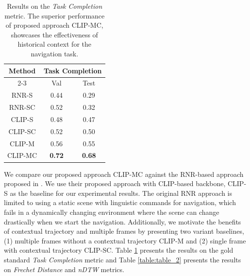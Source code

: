 \documentclass[11pt]{article}
\begin{document}
\begin{table}[]
\begin{center}
\small
\begin{tabular}{|c|cc|}
\hline
\multirow{2}{*}{Method} & \multicolumn{2}{c|}{Task Completion}               \\ \cline{2-3} 
                        & \multicolumn{1}{c|}{Val}           & Test          \\ \hline
RNR-S                   & \multicolumn{1}{c|}{0.44}          & 0.29          \\ \hline
RNR-SC                  & \multicolumn{1}{c|}{0.52}          & 0.32          \\ \hline
CLIP-S                  & \multicolumn{1}{c|}{0.48}          & 0.47          \\ \hline
CLIP-SC                 & \multicolumn{1}{c|}{0.52}          & 0.50          \\ \hline
CLIP-M                  & \multicolumn{1}{c|}{0.56}          & 0.55          \\ \hline
CLIP-MC                 & \multicolumn{1}{c|}{\textbf{0.72}} & \textbf{0.68} \\ \hline
\end{tabular}
\end{center}
\caption{Results on the \textit{Task Completion} metric. The superior performance of proposed approach CLIP-MC, showcases the effectiveness of historical context for the navigation task.}
\label{table:table_1}
\end{table}

We compare our proposed approach CLIP-MC against the RNR-based approach proposed in \cite{Rufus_2021}. We use their proposed approach with CLIP-based backbone, CLIP-S as the baseline for our experimental results. The original RNR approach is limited to using a static scene with linguistic commands for navigation, which fails in a dynamically changing environment where the scene can change drastically when we start the navigation. Additionally, we motivate the benefits of contextual trajectory and multiple frames by presenting two variant baselines, (1) multiple frames without a contextual trajectory CLIP-M and (2) single frame with contextual trajectory CLIP-SC. Table \ref{table:table_1} presents the results on the gold standard \textit{Task Completion} metric and Table \ref{table:table_2} presents the results on \textit{Frechet Distance} and \textit{nDTW} metrics.
\end{document}
